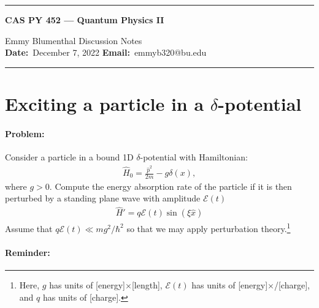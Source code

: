 \documentclass[10pt]{article}
\newcommand{\1}{\mathbf 1}
\begin{document}
\begin{center}
	\hrule
	\vspace{.4cm}
	{\textbf { \large CAS PY 452 --- Quantum Physics II}}
\end{center}
Emmy Blumenthal \hspace{\fill} \hspace{\fill}  \textbf{} Discussion Notes\  \\
\textbf{Date:}\  December 7, 2022   \hspace{\fill} \textbf{Email:}\ emmyb320@bu.edu

\vspace{.4cm}
\hrule

\section*{Exciting a particle in a $\delta$-potential}

\paragraph{Problem:}

Consider a particle in a bound 1D $\delta$-potential with Hamiltonian:
\begin{align}
	\hat H_0 = \frac{\hat p^2}{2m} - g \delta(x),
\end{align}
where $g> 0$.
Compute the energy absorption rate of the particle if it is then perturbed by a standing plane wave with amplitude $\mathcal{E}(t)$
\begin{align}
	\hat H' = q \mathcal{E}(t) \sin(\xi \hat x )
\end{align}
Assume that $q \mathcal{E}(t) \ll m g^2/\hbar^2 $ so that we may apply perturbation theory.\footnote{Here, $g$ has units of [energy]$\times$[length], $\mathcal{E}(t)$ has units of [energy]$\times$/[charge], and $q$ has units of [charge].}

\paragraph{Reminder:}
\end{document}
